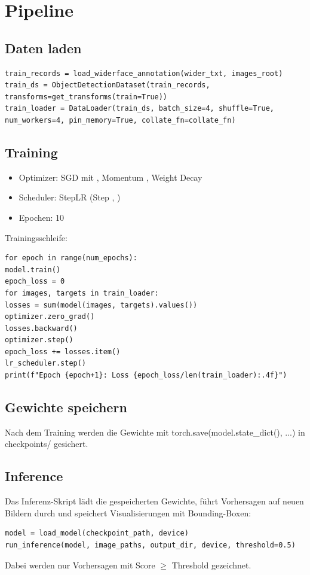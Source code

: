 \documentclass[11pt,a4paper]{article}
\begin{document}
\section{Pipeline}
\subsection{Daten laden}
\begin{lstlisting}
train_records = load_widerface_annotation(wider_txt, images_root)
train_ds = ObjectDetectionDataset(train_records, transforms=get_transforms(train=True))
train_loader = DataLoader(train_ds, batch_size=4, shuffle=True, num_workers=4, pin_memory=True, collate_fn=collate_fn)
\end{lstlisting}

\subsection{Training}
\begin{itemize}
\item Optimizer: SGD mit , Momentum , Weight Decay 
\item Scheduler: StepLR (Step , )
\item Epochen: 10
\end{itemize}
Trainingsschleife:
\begin{lstlisting}
for epoch in range(num_epochs):
model.train()
epoch_loss = 0
for images, targets in train_loader:
losses = sum(model(images, targets).values())
optimizer.zero_grad()
losses.backward()
optimizer.step()
epoch_loss += losses.item()
lr_scheduler.step()
print(f"Epoch {epoch+1}: Loss {epoch_loss/len(train_loader):.4f}")
\end{lstlisting}

\subsection{Gewichte speichern}
Nach dem Training werden die Gewichte mit torch.save(model.state\_dict(), ...) in checkpoints/ gesichert.

\subsection{Inference}
Das Inferenz-Skript lädt die gespeicherten Gewichte, führt Vorhersagen auf neuen Bildern durch und speichert Visualisierungen mit Bounding-Boxen:
\begin{lstlisting}
model = load_model(checkpoint_path, device)
run_inference(model, image_paths, output_dir, device, threshold=0.5)
\end{lstlisting}
Dabei werden nur Vorhersagen mit Score $\geq$ Threshold gezeichnet.
\end{document}
